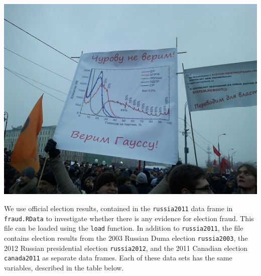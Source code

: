 \documentclass[11pt]{article}
\begin{document}
\begin{center}
	\includegraphics[scale=0.4]{figures/russia-fraud.jpg}	
\end{center}


We use official election results, contained in the {\tt russia2011} data frame in {\tt fraud.RData} to investigate whether there is any evidence for election fraud.  This file can be loaded using the {\tt load} function. In addition to {\tt russia2011}, the file contains election results from the 2003 Russian Duma election {\tt russia2003}, the 2012 Russian presidential election {\tt russia2012}, and the 2011 Canadian election {\tt canada2011} as separate data frames.  Each of these data sets has the same variables, described in the table below.
\end{document}
